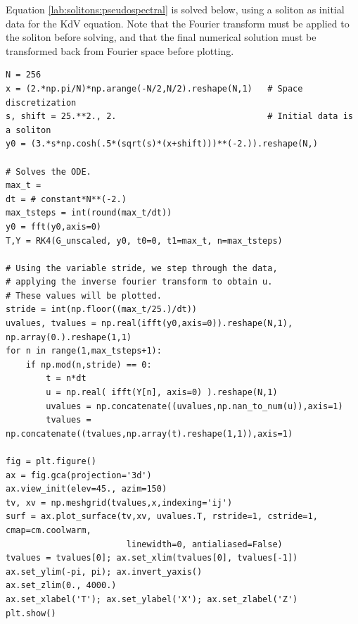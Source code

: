 Equation \eqref{lab:solitons:pseudospectral} is solved below, using a soliton as initial data for the KdV equation. 
Note that the Fourier transform must be applied to the soliton before solving, and that the final numerical solution must be transformed back from Fourier space before plotting. 
\begin{lstlisting}
N = 256
x = (2.*np.pi/N)*np.arange(-N/2,N/2).reshape(N,1)   # Space discretization
s, shift = 25.**2., 2.  							# Initial data is a soliton
y0 = (3.*s*np.cosh(.5*(sqrt(s)*(x+shift)))**(-2.)).reshape(N,) 

# Solves the ODE.
max_t = 
dt = # constant*N**(-2.)
max_tsteps = int(round(max_t/dt))
y0 = fft(y0,axis=0)
T,Y = RK4(G_unscaled, y0, t0=0, t1=max_t, n=max_tsteps)

# Using the variable stride, we step through the data, 
# applying the inverse fourier transform to obtain u.
# These values will be plotted.
stride = int(np.floor((max_t/25.)/dt))
uvalues, tvalues = np.real(ifft(y0,axis=0)).reshape(N,1), np.array(0.).reshape(1,1)
for n in range(1,max_tsteps+1):
	if np.mod(n,stride) == 0:
		t = n*dt
		u = np.real( ifft(Y[n], axis=0) ).reshape(N,1)
		uvalues = np.concatenate((uvalues,np.nan_to_num(u)),axis=1)
		tvalues = np.concatenate((tvalues,np.array(t).reshape(1,1)),axis=1)

fig = plt.figure()
ax = fig.gca(projection='3d')
ax.view_init(elev=45., azim=150)
tv, xv = np.meshgrid(tvalues,x,indexing='ij')
surf = ax.plot_surface(tv,xv, uvalues.T, rstride=1, cstride=1, cmap=cm.coolwarm,
						linewidth=0, antialiased=False)
tvalues = tvalues[0]; ax.set_xlim(tvalues[0], tvalues[-1])
ax.set_ylim(-pi, pi); ax.invert_yaxis()
ax.set_zlim(0., 4000.)
ax.set_xlabel('T'); ax.set_ylabel('X'); ax.set_zlabel('Z')
plt.show()
\end{lstlisting}

